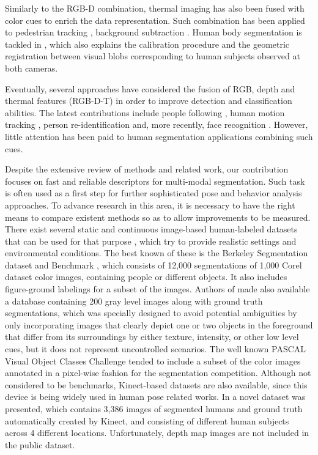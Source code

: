 \documentclass[10pt,twocolumn,letterpaper]{article}
\begin{document}
Similarly to the RGB-D combination, thermal imaging has also been fused with color cues to enrich the data representation. Such combination has been applied to pedestrian tracking \cite{leykin2006robust, leykin2007thermal}, background subtraction \cite{davis2007background}. Human body segmentation is tackled in \cite{zhao2012human}, which also explains the calibration procedure and the geometric registration between visual blobs corresponding to human subjects observed at both cameras. 

Eventually, several approaches have considered the fusion of RGB, depth and thermal features (RGB-D-T) in order to improve detection and classification abilities. The latest contributions include people following \cite{susperregi2013rgb}, human motion tracking \cite{chun2013applications}, person re-identification \cite{mogelmosetri} and, more recently, face recognition \cite{nikisinsrgb}. However, little attention has been paid to human segmentation applications combining such cues.

Despite the extensive review of methods and related work, our contribution focuses on fast and reliable descriptors for multi-modal segmentation. Such task is often used as a first step for further sophisticated pose and behavior analysis approaches. To advance research in this area, it is necessary to have the right means to compare existent methods so as to allow improvements to be measured. There exist several static and continuous image-based human-labeled datasets that can be used for that purpose \cite{moeslund2011visual}, which try to provide realistic settings and environmental conditions. The best known of these is the Berkeley Segmentation dataset and Benchmark \cite{martin2001database}, which consists of 12,000 segmentations of 1,000 Corel dataset color images, containing people or different objects. It also includes figure-ground labelings for a subset of the images. Authors of \cite{alpert2007} made also available a database containing 200 gray level images along with ground truth segmentations, which was specially designed to avoid potential ambiguities by only incorporating images that clearly depict one or two objects in the foreground that differ from its surroundings by either texture, intensity, or other low level cues, but it does not represent uncontrolled scenarios. The well known PASCAL Visual Object Classes Challenge \cite{everingham2012pascal} tended to include a subset of the color images annotated in a pixel-wise fashion for the segmentation competition. Although not considered to be benchmarks, Kinect-based datasets are also available, since this device is being widely used in human pose related works. In \cite{gulshan2011humanising} a novel dataset was presented, which contains 3,386 images of segmented humans and ground truth automatically created by Kinect, and consisting of different human subjects across 4 different locations. Unfortunately, depth map images are not included in the public dataset. 
\end{document}
